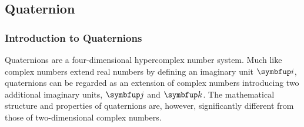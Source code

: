 \begin{comment}
Note that the axis-angle representation consists of four scalar parameters (the three components of $\varel{\rotax}{\alpha}{\beta}$ and the angle $\rel{\rotang}{\alpha}{\beta}$), and therefore it is non-minimal. It is also ambiguous: from () we can easily see that there are multiple axis-angle combinations that correspond tothe same rotation matrix, and therefore encode the same actual rotation:
\begin{gather*}
\RotMAxAng{\mcol{\rotax}}{\rotang} = \RotMAxAng{-\mcol{\rotax}}{-\rotang}\\
\RotMAxAng{\mcol{\rotax}}{\rotang + \pi} = \RotMAxAng{-\mcol{\rotax}}{\pi-\rotang}
\end{gather*}
Even if we restrict the rotation angle to the range [-pi,pi]
 given an axis $\vabs{\rotax}$, rotation angles $\rotang + 2k\pi, \forall k\in \mathbb{Z}$ all yield the same rotation matrix, and therefore encode the same actual rotation. This ambiguity can be partially solved by restricting $\rotang$ to the range $\[0,2\pi\)$, but even then case n $\rotang and -n (2pi-rotax) Additionally, the axis-angle description does not provide a straightforward method for composing successive rotations.
\begin{gather*}
\RotMAxAng{\mcol{\rotax}}{0} = \IdM \\
\RotMAxAng{\mcol{\rotax}}{\rotang} = \RotMAxAng{-\mcol{\rotax}}{-\rotang}\\
\RotMAxAng{\mcol{\rotax}}{\rotang + \pi} = \RotMAxAng{-\mcol{\rotax}}{\pi-\rotang}
\end{gather*}

\end{comment}

\subsection{Quaternion}
\subsubsection{Introduction to Quaternions}
Quaternions are a four-dimensional hypercomplex number system. Much like complex numbers extend real numbers by defining an imaginary unit $\qi$, quaternions can be regarded as an extension of complex numbers introducing two additional imaginary units, $\qj$ and $\qk$. The mathematical structure and properties of quaternions are, however, significantly different from those of two-dimensional complex numbers.

